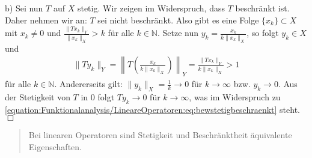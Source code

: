 \documentclass[letterpaper,10pt,english]{jupyterBook}
\begin{document}
b) Sei nun \(T\) auf \(X\) stetig. Wir zeigen im Widerspruch, dass \(T\) beschränkt ist. Daher nehmen wir an: \(T\) sei nicht beschränkt. Also gibt es eine Folge \(\{x_k\} \subset X\) mit \(x_k \not=0\) und \(\frac{\|T x_k\|_Y}{\|x_k\|_X} > k\) für alle \(k\in \mathbb{N}\). Setze nun \(y_k = \frac{x_k}{k \|x_k\|_X}\), so folgt \(y_k\in X\) und
\begin{equation}\label{equation:Funktionalanalysis/LineareOperatoren:eq:bewstetigbeschraenkt}
\begin{split}\|T y_k\|_Y = \left\| T\left(\frac{x_k}{k \|x_k\|_X}\right)\right\|_Y = \frac{\|T x_k\|_Y}{k \|x_k\|_X} > 1\end{split}
\end{equation}
für alle \(k\in \mathbb{N}\). Andererseits gilt: \(\|y_k\|_X = \frac{1}{k} \to 0\) für \(k\to \infty\) bzw. \(y_k \to 0\). Aus der Stetigkeit von \(T\) in \(0\) folgt \(T y_k \to 0\) für \(k\to\infty\), was im Widerspruch zu \eqref{equation:Funktionalanalysis/LineareOperatoren:eq:bewstetigbeschraenkt} steht. \(\Box\)
\begin{quote}

Bei linearen Operatoren sind Stetigkeit und Beschränktheit äquivalente Eigenschaften.
\end{quote}
\end{document}
